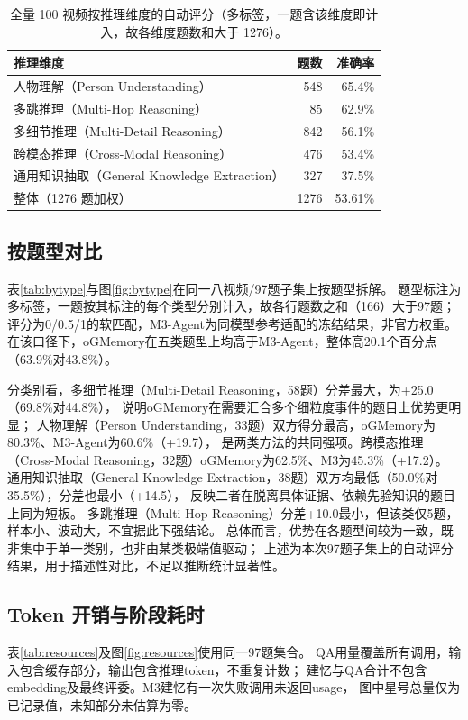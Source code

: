 \documentclass[UTF8,a4paper,11pt,fontset=fandol]{ctexart}
\newcommand*{\memoryprojectname}{oGMemory}
\begin{document}
\begin{table}[htbp]\centering\small
\caption{全量 100 视频按推理维度的自动评分（多标签，一题含该维度即计入，故各维度题数和大于 1276）。}
\label{tab:full100dim}\begin{tabular}{lrr}\toprule
推理维度 & 题数 & 准确率 \\\midrule
人物理解（Person Understanding） & 548 & 65.4\% \\
多跳推理（Multi-Hop Reasoning） & 85 & 62.9\% \\
多细节推理（Multi-Detail Reasoning） & 842 & 56.1\% \\
跨模态推理（Cross-Modal Reasoning） & 476 & 53.4\% \\
通用知识抽取（General Knowledge Extraction） & 327 & 37.5\% \\\midrule
整体（1276 题加权） & 1276 & 53.61\% \\
\bottomrule\end{tabular}
\end{table}


\subsection{按题型对比}
表\ref{tab:bytype}与图\ref{fig:bytype}在同一八视频/97题子集上按题型拆解。
题型标注为多标签，一题按其标注的每个类型分别计入，故各行题数之和（166）大于97题；
评分为0/0.5/1的软匹配，M3-Agent为同模型参考适配的冻结结果，非官方权重。
在该口径下，\memoryprojectname{}在五类题型上均高于M3-Agent，整体高20.1个百分点（63.9\%对43.8\%）。

分类别看，多细节推理（Multi-Detail Reasoning，58题）分差最大，为+25.0（69.8\%对44.8\%），
说明\memoryprojectname{}在需要汇合多个细粒度事件的题目上优势更明显；
人物理解（Person Understanding，33题）双方得分最高，\memoryprojectname{}为80.3\%、M3-Agent为60.6\%（+19.7），
是两类方法的共同强项。跨模态推理（Cross-Modal Reasoning，32题）\memoryprojectname{}为62.5\%、M3为45.3\%（+17.2）。
通用知识抽取（General Knowledge Extraction，38题）双方均最低（50.0\%对35.5\%），分差也最小（+14.5），
反映二者在脱离具体证据、依赖先验知识的题目上同为短板。
多跳推理（Multi-Hop Reasoning）分差+10.0最小，但该类仅5题，样本小、波动大，不宜据此下强结论。
总体而言，优势在各题型间较为一致，既非集中于单一类别，也非由某类极端值驱动；
上述为本次97题子集上的自动评分结果，用于描述性对比，不足以推断统计显著性。

\subsection{Token 开销与阶段耗时}
表\ref{tab:resources}及图\ref{fig:resources}使用同一97题集合。
QA用量覆盖所有调用，输入包含缓存部分，输出包含推理token，不重复计数；
建忆与QA合计不包含embedding及最终评委。M3建忆有一次失败调用未返回usage，
图中星号总量仅为已记录值，未知部分未估算为零。
\end{document}
